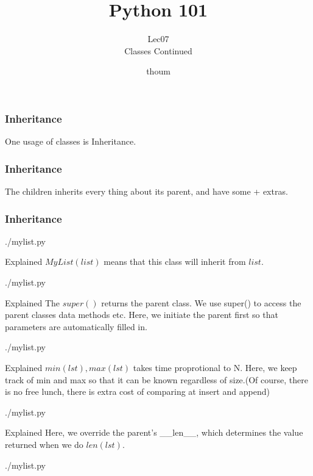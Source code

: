 \documentclass{beamer}
\title{Python 101}
\subtitle{Lec07 \\ Classes Continued}
\author{thoum}
\begin{document}
\frame{\titlepage}

\begin{frame}
\frametitle{Inheritance}
One usage of classes is Inheritance.
\end{frame}

\begin{frame}
\frametitle{Inheritance}
The children inherits every thing about its parent, and have some + extras.
\end{frame}

\begin{frame}[fragile]
\frametitle{Inheritance}
\begin{lstinputlisting}
  {./mylist.py}
\end{lstinputlisting}
\end{frame}

\begin{frame}{Explained}
  $MyList(list)$ means that this class will inherit from $list$.
  \begin{lstinputlisting}[firstline=1, lastline=1]
  {./mylist.py}
\end{lstinputlisting}
\end{frame}

\begin{frame}{Explained}
  The $super()$ returns the parent class. We use super() to access the parent
  classes data methods etc. Here, we initiate the parent first so that
  parameters are automatically filled in.
  \begin{lstinputlisting}[firstline=1, lastline=3]
  {./mylist.py}
\end{lstinputlisting}
\end{frame}

\begin{frame}{Explained}
  $min(lst), max(lst)$ takes time proprotional to N. Here, we keep track of min
  and max so that it can be known regardless of size.(Of course, there is no
  free lunch, there is extra cost of comparing at insert and append)
  \begin{lstinputlisting}[firstline=1, lastline=6]
  {./mylist.py}
  \end{lstinputlisting}
\end{frame}

\begin{frame}{Explained}
  Here, we override the parent's \_\_len\_\_, which determines the value
  returned when we do $len(lst)$.
  \begin{lstinputlisting}[firstline=9, lastline=10]
    {./mylist.py}
  \end{lstinputlisting}
\end{frame}
\end{document}
